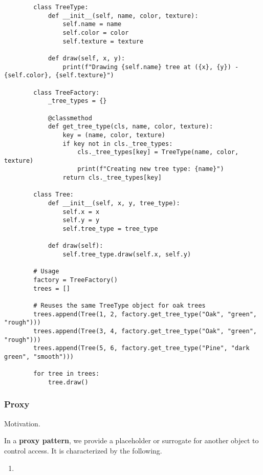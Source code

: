     \begin{example}
      \begin{lstlisting}
        class TreeType:
            def __init__(self, name, color, texture):
                self.name = name
                self.color = color
                self.texture = texture
            
            def draw(self, x, y):
                print(f"Drawing {self.name} tree at ({x}, {y}) - {self.color}, {self.texture}")

        class TreeFactory:
            _tree_types = {}
            
            @classmethod
            def get_tree_type(cls, name, color, texture):
                key = (name, color, texture)
                if key not in cls._tree_types:
                    cls._tree_types[key] = TreeType(name, color, texture)
                    print(f"Creating new tree type: {name}")
                return cls._tree_types[key]

        class Tree:
            def __init__(self, x, y, tree_type):
                self.x = x
                self.y = y
                self.tree_type = tree_type
            
            def draw(self):
                self.tree_type.draw(self.x, self.y)

        # Usage
        factory = TreeFactory()
        trees = []

        # Reuses the same TreeType object for oak trees
        trees.append(Tree(1, 2, factory.get_tree_type("Oak", "green", "rough")))
        trees.append(Tree(3, 4, factory.get_tree_type("Oak", "green", "rough")))
        trees.append(Tree(5, 6, factory.get_tree_type("Pine", "dark green", "smooth")))

        for tree in trees:
            tree.draw() 
      \end{lstlisting}
    \end{example}

  \subsubsection{Proxy}

    Motivation. 

    \begin{definition}
      In a \textbf{proxy pattern}, we provide a placeholder or surrogate for another object to control access. It is characterized by the following. 
      \begin{enumerate}
        \item 
      \end{enumerate}
    \end{definition}

